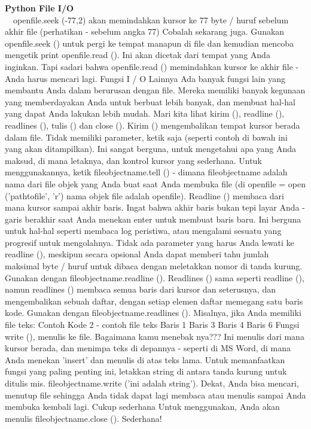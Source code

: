 \begin{center}{\fontsize{24pt}{24pt}\selectfont \textbf{Python File I/O} \\}
 $  $ $  $ $  $ $  $openfile.seek (-77,2) akan memindahkan kursor ke 77 byte / huruf sebelum akhir file (perhatikan - sebelum angka 77) 
Cobalah sekarang juga. Gunakan openfile.seek () untuk pergi ke tempat manapun di file dan kemudian mencoba mengetik print openfile.read (). Ini akan dicetak dari tempat yang Anda inginkan. Tapi sadari bahwa openfile.read () memindahkan kursor ke akhir file - Anda harus mencari lagi.
Fungsi I / O Lainnya 
Ada banyak fungsi lain yang membantu Anda dalam berurusan dengan file. Mereka memiliki banyak kegunaan yang memberdayakan Anda untuk berbuat lebih banyak, dan membuat hal-hal yang dapat Anda lakukan lebih mudah. Mari kita lihat kirim (), readline (), readlines (), tulis () dan close ().
Kirim () mengembalikan tempat kursor berada dalam file. Tidak memiliki parameter, ketik saja (seperti contoh di bawah ini yang akan ditampilkan). Ini sangat berguna, untuk mengetahui apa yang Anda maksud, di mana letaknya, dan kontrol kursor yang sederhana. Untuk menggunakannya, ketik fileobjectname.tell () - dimana fileobjectname adalah nama dari file objek yang Anda buat saat Anda membuka file (di openfile = open ('pathtofile', 'r') nama objek file adalah openfile).
Readline () membaca dari mana kursor sampai akhir baris. Ingat bahwa akhir baris bukan tepi layar Anda - garis berakhir saat Anda menekan enter untuk membuat baris baru. Ini berguna untuk hal-hal seperti membaca log peristiwa, atau mengalami sesuatu yang progresif untuk mengolahnya. Tidak ada parameter yang harus Anda lewati ke readline (), meskipun secara opsional Anda dapat memberi tahu jumlah maksimal byte / huruf untuk dibaca dengan meletakkan nomor di tanda kurung. Gunakan dengan fileobjectname.readline (). 
Readlines () sama seperti readline (), namun readlines () membaca semua baris dari kursor dan seterusnya, dan mengembalikan sebuah daftar, dengan setiap elemen daftar memegang satu baris kode. Gunakan dengan fileobjectname.readlines (). Misalnya, jika Anda memiliki file teks: 
Contoh Kode 2 - contoh file teks 
Baris 1  
Baris 3  
Baris 4  
Baris 6  
Fungsi write (), menulis ke file. Bagaimana kamu menebak nya??? Ini menulis dari mana kursor berada, dan menimpa teks di depannya - seperti di MS Word, di mana Anda menekan 'insert' dan menulis di atas teks lama. Untuk memanfaatkan fungsi yang paling penting ini, letakkan string di antara tanda kurung untuk ditulis mis. fileobjectname.write ('ini adalah string'). 
Dekat, Anda bisa mencari, menutup file sehingga Anda tidak dapat lagi membaca atau menulis sampai Anda membuka kembali lagi. Cukup sederhana Untuk menggunakan, Anda akan menulis fileobjectname.close (). Sederhana! 

\end{center}

